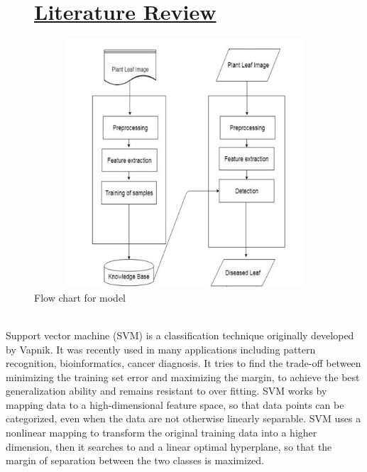 \documentclass[12pt,a4paper, oneside]{article}
\begin{document}
\pagebreak
\begin{figure}
\section{\underline{ Literature Review}}
\includegraphics[width=450,height=350]{images/LR.jpg}
\caption{Flow chart for model}
\end{figure}\\
Support vector machine (SVM) is a classification technique originally developed by Vapnik. It was recently used in many applications including pattern recognition, bioinformatics, cancer diagnosis. It tries to find the trade-off between minimizing the training set error and maximizing the margin, to achieve the best generalization ability and remains resistant to over fitting. SVM works by mapping data to a high-dimensional feature space, so that data points can be categorized, even when the data are not otherwise linearly separable. SVM uses a nonlinear mapping to transform the original training data into a higher dimension, then it searches to and a linear optimal hyperplane, so that the margin of separation between the two classes is maximized.

\pagebreak
\end{document}
